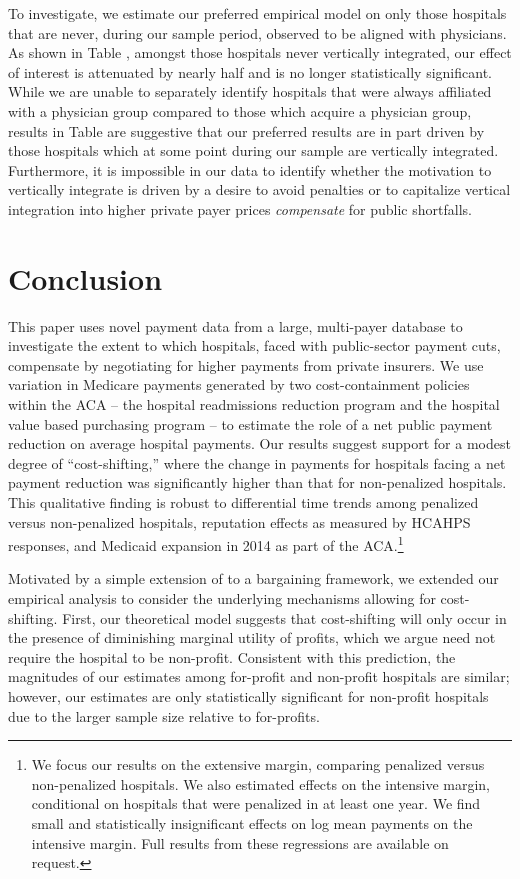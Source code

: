 \documentclass[12pt]{article}
\begin{document}
To investigate, we estimate our preferred empirical model on only those hospitals that are never, during our sample period, observed to be aligned with physicians.  As shown in Table \label{ref:vint}, amongst those hospitals never vertically integrated, our effect of interest is attenuated by nearly half and is no longer statistically significant.  While we are unable to separately identify hospitals that were always affiliated with a physician group compared to those which acquire a physician group, results in Table \label{ref:vint} are suggestive that our preferred results are in part driven by those hospitals which at some point during our sample are vertically integrated.  Furthermore, it is impossible in our data to identify whether the motivation to vertically integrate is driven by a desire to avoid penalties or to capitalize vertical integration into higher private payer prices \textit{compensate} for public shortfalls.  

\section{Conclusion}
\label{sec:Conclusion}
This paper uses novel payment data from a large, multi-payer database to investigate the extent to which hospitals, faced with public-sector payment cuts, compensate by negotiating for higher payments from private insurers.  We use variation in Medicare payments generated by two cost-containment policies within the ACA -- the hospital readmissions reduction program and the hospital value based purchasing program -- to estimate the role of a net public payment reduction on average hospital payments.  Our results suggest support for a modest degree of ``cost-shifting,''  where the change in payments for hospitals facing a net payment reduction was significantly higher than that for non-penalized hospitals. This qualitative finding is robust to differential time trends among penalized versus non-penalized hospitals, reputation effects as measured by HCAHPS responses, and Medicaid expansion in 2014 as part of the ACA.\footnote{We focus our results on the extensive margin, comparing penalized versus non-penalized hospitals. We also estimated effects on the intensive margin, conditional on hospitals that were penalized in at least one year. We find small and statistically insignificant effects on log mean payments on the intensive margin. Full results from these regressions are available on request.}

Motivated by a simple extension of \cite{dranove1988} to a bargaining framework, we extended our empirical analysis to consider the underlying mechanisms allowing for cost-shifting. First, our theoretical model suggests that cost-shifting will only occur in the presence of diminishing marginal utility of profits, which we argue need not require the hospital to be non-profit. Consistent with this prediction, the magnitudes of our estimates among for-profit and non-profit hospitals are similar; however, our estimates are only statistically significant for non-profit hospitals due to the larger sample size relative to for-profits.
\end{document}
